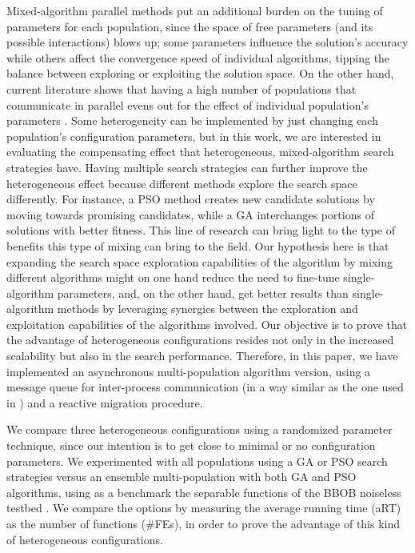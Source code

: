 \documentclass[runningheads]{llncs}
\begin{document}
Mixed-algorithm parallel methods put an
additional burden on the tuning of parameters for each population,
since the space of free parameters (and its possible interactions)
blows up; some
parameters influence the solution's accuracy while others affect the convergence
speed of individual algorithms, tipping the balance between exploring or
exploiting the solution space. On the other hand, current literature shows that
having a high number of populations that communicate in parallel
evens out
for the effect of individual population's parameters
\cite{li2016multi,tanabe2013evaluation}. Some heterogeneity can be implemented
by just changing each population's configuration parameters, but in this work,
we are interested in evaluating the compensating effect that
heterogeneous, mixed-algorithm search strategies have. 
Having multiple search strategies can further improve the heterogeneous effect
because different methods explore the search space differently. For instance, a
PSO method creates new candidate solutions by moving towards promising
candidates, while a GA interchanges portions of solutions with better fitness.
This line of research can bring light to the type of benefits this type of
mixing can bring to the field.
Our hypothesis here is that expanding the search space exploration
capabilities of the algorithm by mixing different algorithms might on
one hand reduce the need to fine-tune single-algorithm parameters,
and, on the other hand, get better results than single-algorithm
methods by leveraging synergies between the exploration and
exploitation capabilities of the algorithms involved. Our objective is to prove that
the advantage of heterogeneous configurations resides not only in the increased
scalability but also in the search performance.
Therefore, in this paper, we  have implemented an asynchronous
multi-population algorithm version, using a message queue for inter-process
communication (in a way similar as the one used in
\cite{guervos2018introducing}) and a reactive migration procedure.

We compare three heterogeneous configurations using a randomized
parameter technique, since our intention is to get close to minimal or
no configuration parameters.  We experimented with all populations
using a GA or PSO search strategies versus an ensemble
multi-population with both GA and PSO algorithms, using as a benchmark
the separable functions of the BBOB noiseless testbed
\cite{hansen2009real}. We compare the options by measuring the average
running time (aRT) as the number of functions (\#FEs), in order to
prove the advantage of this kind of heterogeneous configurations.
\end{document}
